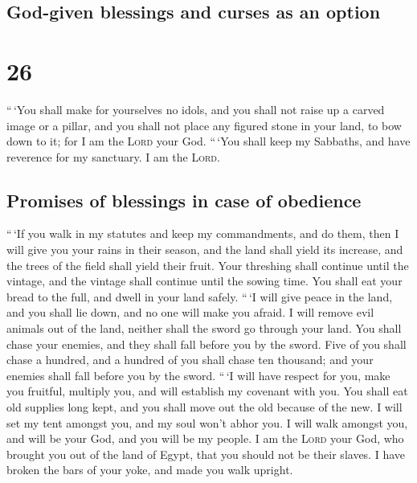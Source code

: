 \hypertarget{god-given-blessings-and-curses-as-an-option}{%
\subsection{God-given blessings and curses as an
option}\label{god-given-blessings-and-curses-as-an-option}}

\hypertarget{section-25}{%
\section{26}\label{section-25}}

 ``\,`You shall make for yourselves no idols, and you
shall not raise up a carved image or a pillar, and you shall not place
any figured stone in your land, to bow down to it; for I am the
\textsc{Lord} your God.  ``\,`You shall keep my Sabbaths,
and have reverence for my sanctuary. I am the \textsc{Lord}.

\hypertarget{promises-of-blessings-in-case-of-obedience}{%
\subsection{Promises of blessings in case of
obedience}\label{promises-of-blessings-in-case-of-obedience}}

 ``\,`If you walk in my statutes and keep my commandments,
and do them,  then I will give you your rains in their
season, and the land shall yield its increase, and the trees of the
field shall yield their fruit.  Your threshing shall
continue until the vintage, and the vintage shall continue until the
sowing time. You shall eat your bread to the full, and dwell in your
land safely.  ``\,`I will give peace in the land, and you
shall lie down, and no one will make you afraid. I will remove evil
animals out of the land, neither shall the sword go through your land.
 You shall chase your enemies, and they shall fall before
you by the sword.  Five of you shall chase a hundred, and
a hundred of you shall chase ten thousand; and your enemies shall fall
before you by the sword.  ``\,`I will have respect for
you, make you fruitful, multiply you, and will establish my covenant
with you.  You shall eat old supplies long kept, and you
shall move out the old because of the new.  I will set my
tent amongst you, and my soul won't abhor you.  I will
walk amongst you, and will be your God, and you will be my people.
 I am the \textsc{Lord} your God, who brought you out of
the land of Egypt, that you should not be their slaves. I have broken
the bars of your yoke, and made you walk upright.

